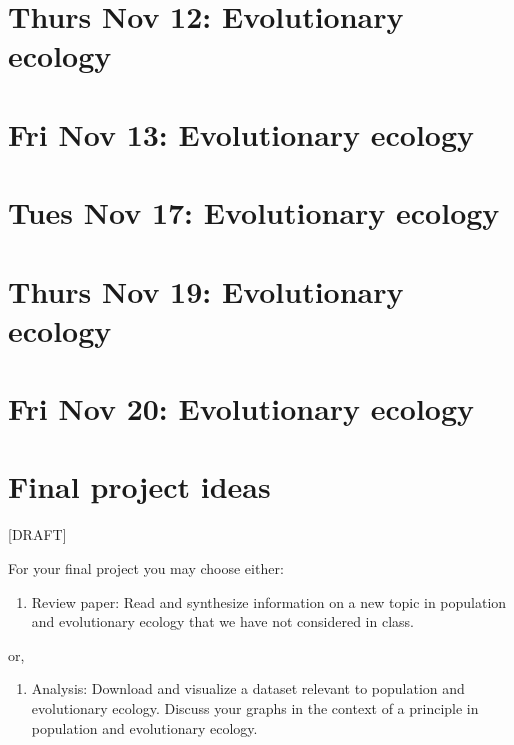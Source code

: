 \documentclass[]{book}
\providecommand{\tightlist}{%
  \setlength{\itemsep}{0pt}\setlength{\parskip}{0pt}}
\begin{document}
\chapter{Thurs Nov 12: Evolutionary
ecology}\label{thurs-nov-12-evolutionary-ecology}

\chapter{Fri Nov 13: Evolutionary
ecology}\label{fri-nov-13-evolutionary-ecology}

\chapter{Tues Nov 17: Evolutionary
ecology}\label{tues-nov-17-evolutionary-ecology}

\chapter{Thurs Nov 19: Evolutionary
ecology}\label{thurs-nov-19-evolutionary-ecology}

\chapter{Fri Nov 20: Evolutionary
ecology}\label{fri-nov-20-evolutionary-ecology}

\chapter{Final project ideas}\label{final-project-ideas}

{[}DRAFT{]}

For your final project you may choose either:

\begin{enumerate}
\def\labelenumi{\arabic{enumi}.}
\tightlist
\item
  Review paper: Read and synthesize information on a new topic in
  population and evolutionary ecology that we have not considered in
  class.
\end{enumerate}

or,

\begin{enumerate}
\def\labelenumi{\arabic{enumi}.}
\setcounter{enumi}{1}
\tightlist
\item
  Analysis: Download and visualize a dataset relevant to population and
  evolutionary ecology. Discuss your graphs in the context of a
  principle in population and evolutionary ecology.
\end{enumerate}
\end{document}
